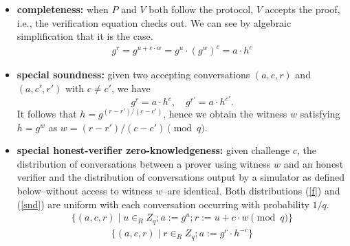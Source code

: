 \documentclass[sigconf,anonymous,review]{acmart}
\begin{document}
\begin{itemize}
  \item \textbf{completeness:} when $P$ and $V$ both follow the protocol, $V$ accepts the proof, i.e., 
  the verification equation checks out. We can see by algebraic simplification that it is the case.
    \begin{align*}
      g^r = g^{u + c \cdot w} = g^u \cdot (g^w)^c = a \cdot h^c
    \end{align*}
  \item \textbf{special soundness:} given two accepting 
  conversations $(a, c, r)$ and $(a, c', r')$ with $c \neq c'$,
  we have 
  \[ g^r = a \cdot h^c, \quad g^{r'} = a \cdot h^{c'}. \]
  It follows that $h = g^{(r-r')/(c-c')}$, hence we obtain
  the witness $w$ satisfying $h=g^w$ as $w = (r - r')/(c - c') \pmod q$.

  \item \textbf{special honest-verifier zero-knowledgeness:}
   given challenge $c$, the distribution of conversations between a prover using
   witness $w$ and an honest verifier and the distribution of conversations output by a
   simulator as defined below--without access to witness $w$--are identical. Both
   distributions (\ref{f}) and (\ref{snd}) are uniform with each conversation occurring 
   with probability $1/q$.
   \begin{align}\label{f}
    \{(a, c, r) \mid u \in_{R} Z_q ; a := g^u; r := u + c \cdot w \pmod q \}
   \end{align}
   \begin{align}\label{snd}
    \{(a, c, r) \mid r \in_{R} Z_q ; a := g^r \cdot h^{-c}\}
   \end{align}
   
\end{itemize}
\end{document}
